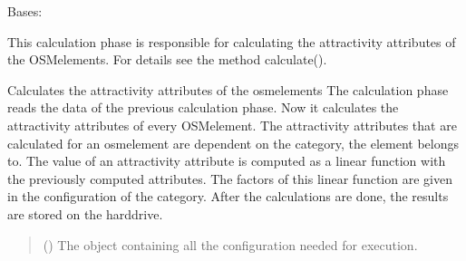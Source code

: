 \documentclass[letterpaper,10pt,english]{sphinxmanual}
\begin{document}
\begin{fulllineitems}
\label{\detokenize{apidoc/src.osm_configurator.model.project.calculation:src.osm_configurator.model.project.calculation.attractivity_phase.AttractivityPhase}}
\pysigstartsignatures
{}
\pysigstopsignatures
\sphinxAtStartPar
Bases: {\hyperref[\detokenize{apidoc/src.osm_configurator.model.project.calculation:src.osm_configurator.model.project.calculation.calculation_phase_interface.ICalculationPhase}]{}}

\sphinxAtStartPar
This calculation phase is responsible for calculating the attractivity attributes of the OSM\sphinxhyphen{}elements.
For details see the method calculate().

\begin{fulllineitems}
\label{\detokenize{apidoc/src.osm_configurator.model.project.calculation:src.osm_configurator.model.project.calculation.attractivity_phase.AttractivityPhase.calculate}}
\pysigstartsignatures
{}
\pysigstopsignatures
\sphinxAtStartPar
Calculates the attractivity attributes of the osm\sphinxhyphen{}elements
The calculation phase reads the data of the previous calculation phase. Now it calculates the attractivity
attributes of every OSM\sphinxhyphen{}element. The attractivity attributes that are calculated for an osm\sphinxhyphen{}element are dependent
on the category, the element belongs to. The value of an attractivity attribute is computed as a linear function
with the previously computed attributes. The factors of this linear function are given in the configuration of
the category. After the calculations are done, the results are stored on the hard\sphinxhyphen{}drive.
\begin{quote}\begin{description}
\sphinxAtStartPar
{} ({\hyperref[\detokenize{apidoc/src.osm_configurator.model.project.configuration:src.osm_configurator.model.project.configuration.configuration_manager.ConfigurationManager}]{}}) \textendash{} The object containing all the configuration needed for execution.


\end{description}
\end{quote}
\end{fulllineitems}
\end{fulllineitems}
\end{document}
